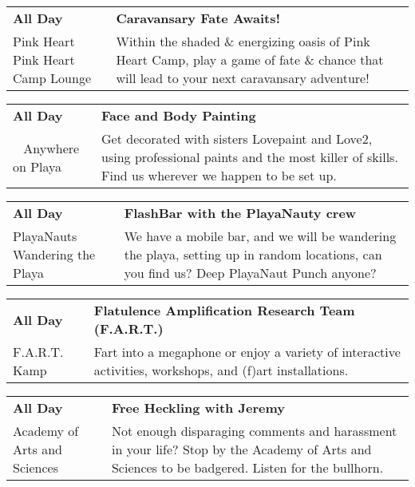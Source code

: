 \begin{tabular}{ p{1in} p{2.2in} }
    \textbf{All Day} & \textbf{Caravansary Fate Awaits!} \\
    Pink Heart \newline Pink Heart Camp Lounge & Within the shaded \& energizing oasis of Pink Heart Camp, play a game of fate \& chance that will lead to your next caravansary adventure! \\
    \hline 
\end{tabular}
    
\begin{tabular}{ p{1in} p{2.2in} }
    \textbf{All Day} & \textbf{Face and Body Painting} \\
    ~ \newline Anywhere on Playa & Get decorated with sisters Lovepaint and Love2, using professional paints and the most killer of skills. Find us wherever we happen to be set up. \\
    \hline 
\end{tabular}
    
\begin{tabular}{ p{1in} p{2.2in} }
    \textbf{All Day} & \textbf{FlashBar with the PlayaNauty crew} \\
    PlayaNauts \newline Wandering the Playa & We have a mobile bar, and we will be wandering the playa, setting up in random locations, can you find us?
Deep PlayaNaut Punch anyone? \\
    \hline 
\end{tabular}
    
\begin{tabular}{ p{1in} p{2.2in} }
    \textbf{All Day} & \textbf{Flatulence Amplification Research Team (F.A.R.T.) } \\
    F.A.R.T. Kamp \newline  & Fart into a megaphone or enjoy a variety of interactive activities, workshops, and (f)art installations. \\
    \hline 
\end{tabular}
    
\begin{tabular}{ p{1in} p{2.2in} }
    \textbf{All Day} & \textbf{Free Heckling with Jeremy} \\
    Academy of Arts and Sciences \newline  & Not enough disparaging comments and harassment in your life?  Stop by the Academy of Arts and Sciences to be badgered.  Listen for the bullhorn. \\
    \hline 
\end{tabular}
    
